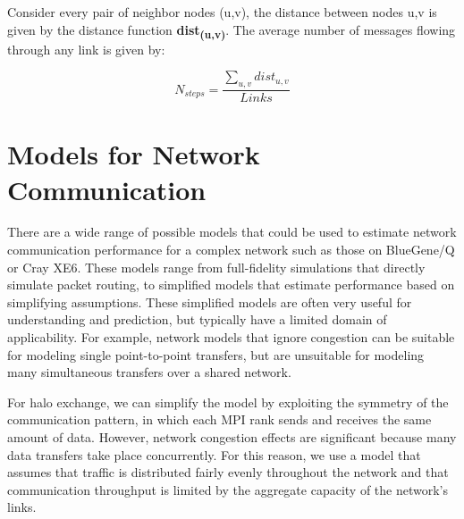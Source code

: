 \documentclass{acm_proc_article-sp}
\begin{document}
Consider every pair of neighbor nodes (u,v), the distance between nodes u,v is given by the distance function \textbf{dist\textsubscript{(u,v)}}.
The average number of messages flowing through any link is given by:

\begin{equation}
  N_{steps} = \frac{ \sum\limits_{u,v} dist_{u,v} } {Links}
\end{equation}


\section{Models for Network Communication}

There are a wide range of possible models that could be used to
estimate network communication performance for a complex network
such as those on BlueGene/Q or Cray XE6.  These models range from
full-fidelity simulations that directly simulate packet routing, to
simplified models that estimate performance based on simplifying
assumptions.  These simplified models are often very useful for
understanding and prediction, but typically have a limited domain
of applicability.  For example, network models that ignore congestion
can be suitable for modeling single point-to-point transfers, but are
unsuitable for modeling many simultaneous transfers over a shared network.

For halo exchange, we can simplify the model by exploiting the
symmetry of the communication pattern, in which each MPI rank sends
and receives the same amount of data.  However,
network congestion effects are significant because many data transfers
take place concurrently.  For this reason, we use a model that assumes
that traffic is distributed fairly evenly throughout the network and
that communication throughput is limited by the aggregate capacity
of the network's links.
\end{document}

